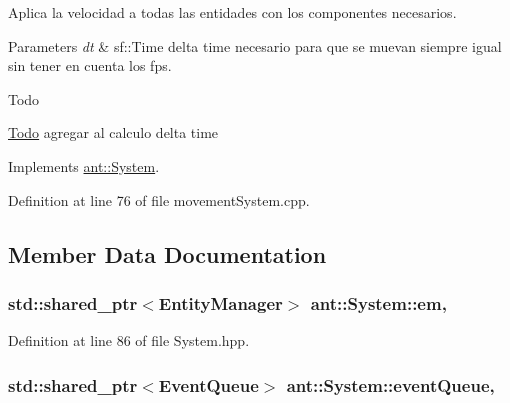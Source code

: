 Aplica la velocidad a todas las entidades con los componentes necesarios. 


\begin{DoxyParams}{Parameters}
{\em dt} & sf\+::\+Time delta time necesario para que se muevan siempre igual sin tener en cuenta los fps. \\
\hline
\end{DoxyParams}
\begin{DoxyRefDesc}{Todo}
\item[\hyperlink{todo__todo000004}{Todo}]agregar al calculo delta time \end{DoxyRefDesc}


Implements \hyperlink{classant_1_1_system_a4d97de105123df07d4d90ac2914f9e6c}{ant\+::\+System}.



Definition at line 76 of file movement\+System.\+cpp.



\subsection{Member Data Documentation}
\hypertarget{classant_1_1_system_a5661d872ff769be150bd4e9a9552f6b9}{
\subsubsection[{em}]{\setlength{\rightskip}{0pt plus 5cm}std\+::shared\+\_\+ptr$<${\bf Entity\+Manager}$>$ ant\+::\+System\+::em\hspace{0.3cm}{\ttfamily [protected]}, {\ttfamily [inherited]}}}\label{classant_1_1_system_a5661d872ff769be150bd4e9a9552f6b9}


Definition at line 86 of file System.\+hpp.

\hypertarget{classant_1_1_system_a27e1814e13d161b5ef0e848e3da16d29}{
\subsubsection[{event\+Queue}]{\setlength{\rightskip}{0pt plus 5cm}std\+::shared\+\_\+ptr$<${\bf Event\+Queue}$>$ ant\+::\+System\+::event\+Queue\hspace{0.3cm}{\ttfamily [protected]}, {\ttfamily [inherited]}}}\label{classant_1_1_system_a27e1814e13d161b5ef0e848e3da16d29}



